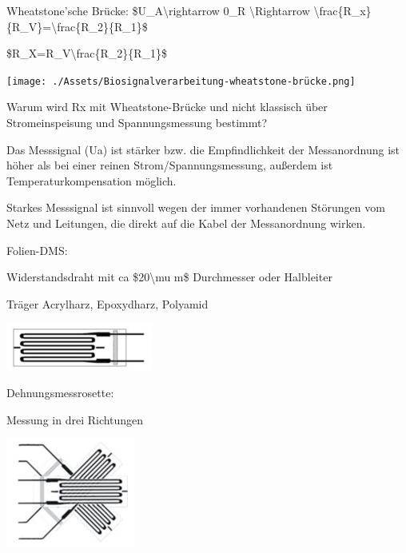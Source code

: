 \documentclass[a4paper]{article}
\begin{document}
\begin{multicols}{3}
  \begin{itemize*}
    \item Wheatstone'sche Brücke: \$U\_A\textbackslash rightarrow 0\textbar\_R \textbackslash Rightarrow \textbackslash frac\{R\_x\}\{R\_V\}=\textbackslash frac\{R\_2\}\{R\_1\}\$
    \item \$R\_X=R\_V\textbackslash frac\{R\_2\}\{R\_1\}\$
    \item \texttt{[image: ./Assets/Biosignalverarbeitung-wheatstone-brücke.png]}
    \item Warum wird Rx mit Wheatstone-Brücke und nicht klassisch über Stromeinspeisung und Spannungsmessung bestimmt?
    \begin{itemize*}
      \item Das Messsignal (Ua) ist stärker bzw. die Empfindlichkeit der Messanordnung ist höher als bei einer reinen Strom/Spannungsmessung, außerdem ist Temperaturkompensation möglich.
      \item Starkes Messsignal ist sinnvoll wegen der immer vorhandenen Störungen vom Netz und Leitungen, die direkt auf die Kabel der Messanordnung wirken.  \end{itemize*}
  \end{itemize*}

  Folien-DMS:
  \begin{itemize*}
    \item Widerstandsdraht mit ca \$20\textbackslash mu m\$ Durchmesser oder Halbleiter
    \item Träger Acrylharz, Epoxydharz, Polyamid
    \item \includegraphics[width=.5\linewidth]{Assets/Biosignalverarbeitung-folien-dms.png}
  \end{itemize*}

  Dehnungsmessrosette:
  \begin{itemize*}
    \item Messung in drei Richtungen
    \item \includegraphics[width=.5\linewidth]{Assets/Biosignalverarbeitung-Dehnungsmessrosette.png}
  \end{itemize*}


\end{multicols}
\end{document}
